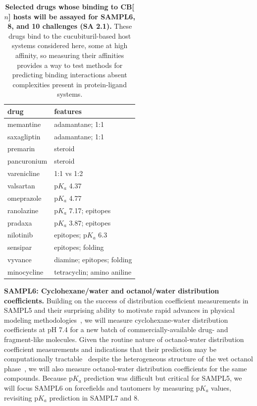 \documentclass[11pt]{article}
\begin{document}
\begin{table}
\vspace{-0.2in}
\footnotesize
\begin{tabular}{l | l}
{\bf drug} & {\bf features} \\
\hline
memantine & adamantane; 1:1 \\
saxagliptin & adamantane; 1:1 \\
premarin & steroid \\
pancuronium & steroid\\
varenicline & 1:1 vs 1:2 \\
valsartan & p$K_a$ 4.37 \\ 
omeprazole & p$K_a$ 4.77 \\
ranolazine & p$K_a$ 7.17; epitopes \\
pradaxa & p$K_a$ 3.87; epitopes \\
nilotinib & epitopes; p$K_a$ 6.3 \\
sensipar & epitopes; folding \\
vyvance & diamine; epitopes; folding \\
minocycline & tetracyclin; amino aniline \\
\end{tabular}
\caption{\label{table:CB} \textbf{Selected drugs whose binding to CB[$n$] hosts will be assayed for SAMPL6, 8, and 10 challenges (SA 2.1).} These drugs bind to the cucubituril-based host systems considered here, some at high affinity, so measuring their affinities provides a way to test methods for predicting binding interactions absent complexities present in protein-ligand systems.
}
\vspace{-0.1in}
\end{table}

\textbf{SAMPL6: Cyclohexane/water and octanol/water distribution coefficients.}
Building on the success of distribution coefficient measurements in SAMPL5 and their surprising ability to motivate rapid advances in physical modeling methodologies~\cite{bannan_blind_2016}, we will measure cyclohexane-water distribution coefficients at pH 7.4 for a new batch of commercially-available drug- and fragment-like molecules.
Given the routine nature of octanol-water distribution coefficient measurements and indications that their prediction may be computationally tractable~\cite{Bhatnagar:2013:PhysicalChemistryChemicalPhysics, bannan_calculating_2016} despite the heterogeneous structure of the wet octanol phase~\cite{Kollman:1996:AccountsofChemicalResearch}, we will also measure octanol-water distribution coefficients for the same compounds.
Because p$K_a$ prediction was difficult but critical for SAMPL5, we will focus SAMPL6 on forcefields and tautomers by measuring p$K_a$ values, revisiting p$K_a$ prediction in SAMPL7 and 8.
\end{document}
